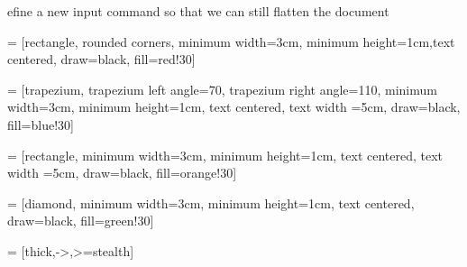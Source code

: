 \let\estinput= define a new input command so that we can still flatten the document

\newcommand{\estwide}[3]{
		\vspace{.75ex}{
			\begin{tabular*}
			{\textwidth}{@{\hskip\tabcolsep\extracolsep\fill}l*{#2}{#3}}
			\toprule
			\estinput{#1}
			\bottomrule
			\addlinespace[.75ex]
			\end{tabular*}
			}
		}	

\newcommand{\estauto}[3]{
		\vspace{.75ex}{
			\begin{tabular}{l*{#2}{#3}}
			\toprule
			\estinput{#1}
			\bottomrule
			\addlinespace[.75ex]
			\end{tabular}
			}
		}

\newcommand{\specialcell}[2][c]{%
    \begin{tabular}[#1]{@{}c@{}}#2\end{tabular}
}



    
\usepackage{tikz}
\usetikzlibrary{shapes.geometric, arrows}

 = [rectangle, rounded corners, minimum width=3cm, minimum height=1cm,text centered, draw=black, fill=red!30]

 = [trapezium, trapezium left angle=70, trapezium right angle=110, minimum width=3cm, minimum height=1cm, text centered, text width =5cm, draw=black, fill=blue!30]

 = [rectangle, minimum width=3cm, minimum height=1cm, text centered, text width =5cm, draw=black, fill=orange!30]

 = [diamond, minimum width=3cm, minimum height=1cm, text centered, draw=black, fill=green!30]

 = [thick,->,>=stealth]
